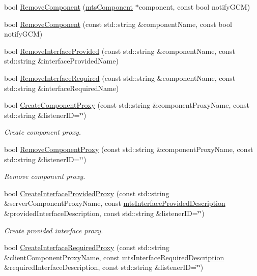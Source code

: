 \begin{DoxyCompactItemize}
\item 
bool \hyperlink{classmts_manager_local_a4cb535c191d77f663bfa38f92a37948f}{Remove\+Component} (\hyperlink{classmts_component}{mts\+Component} $\ast$component, const bool notify\+G\+C\+M)
\item 
bool \hyperlink{classmts_manager_local_a1bab522b229e093d0b4e61c7e7a5e31c}{Remove\+Component} (const std\+::string \&component\+Name, const bool notify\+G\+C\+M)
\item 
bool \hyperlink{classmts_manager_local_a81d9c51989fc1e062fbc0796fc358864}{Remove\+Interface\+Provided} (const std\+::string \&component\+Name, const std\+::string \&interface\+Provided\+Name)
\item 
bool \hyperlink{classmts_manager_local_ad6a62f29de1bef4a01611a2ddd566fa5}{Remove\+Interface\+Required} (const std\+::string \&component\+Name, const std\+::string \&interface\+Required\+Name)
\item 
bool \hyperlink{classmts_manager_local_a200bc8fea319014d8902724564d94481}{Create\+Component\+Proxy} (const std\+::string \&component\+Proxy\+Name, const std\+::string \&listener\+I\+D=\char`\"{}\char`\"{})
\begin{DoxyCompactList}\small\item\em Create component proxy. \end{DoxyCompactList}\item 
bool \hyperlink{classmts_manager_local_ac323b42bdf8078864f78a572625b05e6}{Remove\+Component\+Proxy} (const std\+::string \&component\+Proxy\+Name, const std\+::string \&listener\+I\+D=\char`\"{}\char`\"{})
\begin{DoxyCompactList}\small\item\em Remove component proxy. \end{DoxyCompactList}\item 
bool \hyperlink{classmts_manager_local_a196c71a8ad2532559e6744710954b5aa}{Create\+Interface\+Provided\+Proxy} (const std\+::string \&server\+Component\+Proxy\+Name, const \hyperlink{classmts_interface_provided_description}{mts\+Interface\+Provided\+Description} \&provided\+Interface\+Description, const std\+::string \&listener\+I\+D=\char`\"{}\char`\"{})
\begin{DoxyCompactList}\small\item\em Create provided interface proxy. \end{DoxyCompactList}\item 
bool \hyperlink{classmts_manager_local_a5229948aa578826b68cd5fc0e2ad287e}{Create\+Interface\+Required\+Proxy} (const std\+::string \&client\+Component\+Proxy\+Name, const \hyperlink{classmts_interface_required_description}{mts\+Interface\+Required\+Description} \&required\+Interface\+Description, const std\+::string \&listener\+I\+D=\char`\"{}\char`\"{})

\end{DoxyCompactItemize}
